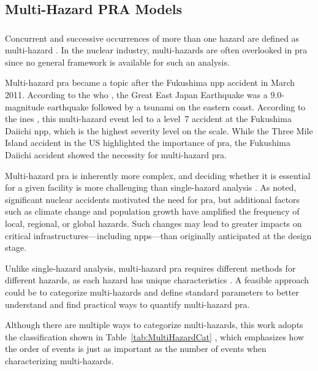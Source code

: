\subsection{Multi-Hazard PRA Models}
\label{sec:multiHazardPRA}

\subsubsection{\color{yellow}{Overview of Multi-Hazard PRA Models}}
\label{subsec:overviewMultiHazard}

Concurrent and successive occurrences of more than one hazard are defined as multi-hazard \cite{47}. In the nuclear industry, multi-hazards are often overlooked in \acrshort{pra} since no general framework is available for such an analysis.

Multi-hazard \acrshort{pra} became a topic after the Fukushima \acrshort{npp} accident in March 2011. According to the \acrshort{who} \cite{48}, the Great East Japan Earthquake was a 9.0-magnitude earthquake followed by a tsunami on the eastern coast. According to the \acrshort{ines} \cite{49}, this multi-hazard event led to a level~7 accident at the Fukushima Daiichi \acrshort{npp}, which is the highest severity level on the scale. While the Three Mile Island accident in the US highlighted the importance of \acrshort{pra}, the Fukushima Daiichi accident showed the necessity for multi-hazard \acrshort{pra}.

Multi-hazard \acrshort{pra} is inherently more complex, and deciding whether it is essential for a given facility is more challenging than single-hazard analysis \cite{50}. As noted, significant nuclear accidents motivated the need for \acrshort{pra}, but additional factors such as climate change and population growth have amplified the frequency of local, regional, or global hazards. Such changes may lead to greater impacts on critical infrastructures---including \acrshort{npp}s---than originally anticipated at the design stage.

Unlike single-hazard analysis, multi-hazard \acrshort{pra} requires different methods for different hazards, as each hazard has unique characteristics \cite{51}. A feasible approach could be to categorize multi-hazards and define standard parameters to better understand and find practical ways to quantify multi-hazard \acrshort{pra}.

Although there are multiple ways to categorize multi-hazards, this work adopts the classification shown in Table~\ref{tab:MultiHazardCat} \cite{52}, which emphasizes how the order of events is just as important as the number of events when characterizing multi-hazards.

